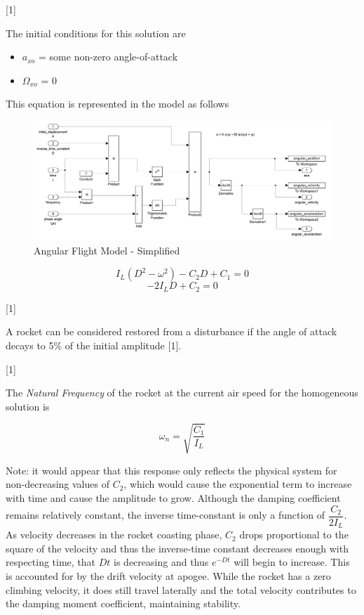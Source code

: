 \documentclass[]{article}
\providecommand{\tightlist}{%
  \setlength{\itemsep}{0pt}\setlength{\parskip}{0pt}}
\begin{document}
{[}1{]}

The initial conditions for this solution are

\begin{itemize}
\tightlist
\item
  \(a_{xo}\) = some non-zero angle-of-attack
\item
  \(\Omega_{xo}\) = 0
\end{itemize}

This equation is represented in the model as follows

\begin{figure}[htbp]
\centering
\includegraphics{images/angular_model_simplified.png}
\caption{Angular Flight Model - Simplified
\label{angular_model_simplified}}
\end{figure}

\[
I_L (D^2 - \omega^2) - C_2 D + C_1 = 0
\] \[
-2 I_L D + C_2 = 0
\]

{[}1{]}

A rocket can be considered restored from a disturbance if the angle of
attack decays to 5\% of the initial amplitude {[}1{]}.

{[}1{]}

The \emph{Natural Frequency} of the rocket at the current air speed for
the homogeneous solution is

\begin{equation}
\label{eq_natural_frequency_homogeneous}
\omega_n = \sqrt{ \dfrac{C_1}{I_L} }
\end{equation}

Note: it would appear that this response only reflects the physical
system for non-decreasing values of \(C_2\), which would cause the
exponential term to increase with time and cause the amplitude to grow.
Although the damping coefficient remains relatively constant, the
inverse time-constant is only a function of \(\dfrac{C_2}{2 I_L}\). As
velocity decreases in the rocket coasting phase, \(C_2\) drops
proportional to the square of the velocity and thus the inverse-time
constant decreases enough with respecting time, that \(Dt\) is
decreasing and thus \(e^{-Dt}\) will begin to increase. This is
accounted for by the drift velocity at apogee. While the rocket has a
zero climbing velocity, it does still travel laterally and the total
velocity contributes to the damping moment coefficient, maintaining
stability.
\end{document}
